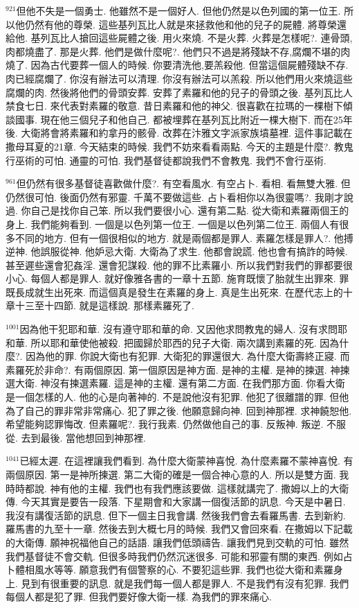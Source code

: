 \documentclass{book}
\begin{document}
$^{921}$但他不失是一個勇士.
他雖然不是一個好人.
但他仍然是以色列國的第一位王.
所以他仍然有他的尊榮.
這些基列瓦比人就是來拯救他和他的兒子的屍體.
將尊榮還給他.
基列瓦比人搶回這些屍體之後.
用火來燒.
不是火葬.
火葬是怎樣呢?.
連骨頭,肉都燒盡了.
那是火葬.
他們是做什麼呢?.
他們只不過是將殘缺不存,腐爛不堪的肉燒了.
因為古代要葬一個人的時候.
你要清洗他,要羔殺他.
但當這個屍體殘缺不存.
肉已經腐爛了.
你沒有辦法可以清理.
你沒有辦法可以羔殺.
所以他們用火來燒這些腐爛的肉.
然後將他們的骨頭安葬.
安葬了素羅和他的兒子的骨頭之後.
基列瓦比人禁食七日.
來代表對素羅的敬意.
昔日素羅和他的神父.
很喜歡在拉瑪的一棵樹下傾談國事.
現在他三個兒子和他自己.
都被埋葬在基列瓦比附近一棵大樹下.
而在25年後.
大衛將會將素羅和約拿丹的骸骨.
改葬在汴雅文字派家族墳墓裡.
這件事記載在撒母耳夏的21章.
今天結束的時候.
我們不妨來看看兩點.
今天的主題是什麼?.
教鬼行巫術的可怕.
通靈的可怕.
我們基督徒都說我們不會教鬼.
我們不會行巫術.

$^{961}$但仍然有很多基督徒喜歡做什麼?.
有空看風水.
有空占卜.
看相.
看無雙大雅.
但仍然很可怕.
後面仍然有邪靈.
千萬不要做這些.
占卜看相你以為很靈嗎?.
我剛才說過.
你自己是找你自己笨.
所以我們要很小心.
還有第二點.
從大衛和素羅兩個王的身上.
我們能夠看到.
一個是以色列第一位王.
一個是以色列第二位王.
兩個人有很多不同的地方.
但有一個很相似的地方.
就是兩個都是罪人.
素羅怎樣是罪人?.
他搏逆神.
他誤服從神.
他妒忌大衛.
大衛為了求生.
他都會說謊.
他也會有搞詐的時候.
甚至遲些還會犯姦淫.
還會犯謀殺.
他的罪不比素羅小.
所以我們對我們的罪都要很小心.
每個人都是罪人.
就好像雅各書的一章十五節.
施育既懷了胎就生出罪來.
罪既長成就生出死來.
而這個真是發生在素羅的身上.
真是生出死來.
在歷代志上的十章十三至十四節.
就是這樣說.
那樣素羅死了.

$^{1001}$因為他干犯耶和華.
沒有遵守耶和華的命.
又因他求問教鬼的婦人.
沒有求問耶和華.
所以耶和華使他被殺.
把國歸於耶西的兒子大衛.
兩次講到素羅的死.
因為什麼?.
因為他的罪.
你說大衛也有犯罪.
大衛犯的罪還很大.
為什麼大衛壽終正寢.
而素羅死於非命?.
有兩個原因.
第一個原因是神方面.
是神的主權.
是神的揀選.
神揀選大衛.
神沒有揀選素羅.
這是神的主權.
還有第二方面.
在我們那方面.
你看大衛是一個怎樣的人.
他的心是向著神的.
不是說他沒有犯罪.
他犯了很離譜的罪.
但他為了自己的罪非常非常痛心.
犯了罪之後.
他願意歸向神.
回到神那裡.
求神饒恕他.
希望能夠認罪悔改.
但素羅呢?.
我行我素.
仍然做他自己的事.
反叛神.
叛逆.
不服從.
去到最後.
當他想回到神那裡.

$^{1041}$已經太遲.
在這裡讓我們看到.
為什麼大衛蒙神喜悅.
為什麼素羅不蒙神喜悅.
有兩個原因.
第一是神所揀選.
第二大衛的確是一個合神心意的人.
所以是雙方面.
我時時都說.
神有他的主權.
我們也有我們應該要做.
這樣就講完了.
撒姆以上的大衛傳.
今天其實是要告一段落.
下星期會和大家講一個復活節的訊息.
今天是中暑日.
我沒有講復活節的訊息.
但下一個主日我會講.
然後我們會去看羅馬書.
去到新約.
羅馬書的九至十一章.
然後去到大概七月的時候.
我們又會回來看.
在撒姆以下記載的大衛傳.
願神祝福他自己的話語.
讓我們低頭禱告.
讓我們見到交軌的可怕.
雖然我們基督徒不會交軌.
但很多時我們仍然沉迷很多.
可能和邪靈有關的東西.
例如占卜體相風水等等.
願意我們有個警察的心.
不要犯這些罪.
我們也從大衛和素羅身上.
見到有很重要的訊息.
就是我們每一個人都是罪人.
不是我們有沒有犯罪.
我們每個人都是犯了罪.
但我們要好像大衛一樣.
為我們的罪來痛心.
\end{document}
